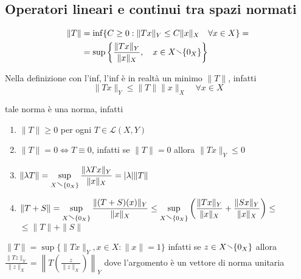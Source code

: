 \subsection{Operatori lineari e continui tra spazi normati}
\begin{align*}
    \|T\| &= \inf \{C \ge 0: \|Tx\|_Y \le C \|x\|_X \quad \forall x \in X\} = \\
          &= \sup \left\{\frac{\|Tx\|_Y}{\|x\|_X}, \quad x \in X \sminus
          \{0_X\} \right\} 
\end{align*}
\begin{note}
    Nella definizione con l'inf, l'inf è in realtà un minimo \(\|T\|\), infatti
    \[
        \|Tx\|_Y \le \|T\|\|x\|_X \quad \forall x \in X
    \]
\end{note}

tale norma è una norma, infatti
\begin{enumerate}[label = \arabic*.]
    \item \(\|T\| \ge 0\) per ogni \(T \in \mathcal{L}{(X, Y)}\) 
    \item \(\|T\| = 0 \iff T \equiv 0\), infatti se \(\|T\| =  0\) allora
        \(\|Tx\|_Y \le 0\) 
    \item \(\displaystyle \|\lambda T\| = \sup_{X \sminus \{0_X\}}  \frac{\|\lambda T x\|_Y}{\|x\|_X}
        = |\lambda|\|T\| \) 
    \item \(\displaystyle\|T+S\| = \sup_{X \sminus \{0_X\} }
        \frac{\|{(T+S)}{(x)}\|_Y}{\|x\|_X} \le \sup_{X \sminus \{0_X\} } {\left(
        \frac{\|Tx\|_Y}{\|x\|_X} + \frac{\|Sx\|_Y}{\|x\|_X}\right)}\le  \) \\\(\le
        \|T\|+\|S\| \) 
\end{enumerate}
\begin{remark}
    \(\|T\| = \sup \{\|Tx\|_Y, x \in X: \|x\|=1\} \) infatti se \(z \in X
    \sminus \{0_X\} \) allora \(\displaystyle \frac{\|Tz\|_Y}{\|z\|_X} = \left\|
    T {\left( \frac{z}{\|z\|_X} \right)} \right\|_Y\) dove l'argomento è un
    vettore di norma unitaria
\end{remark}

